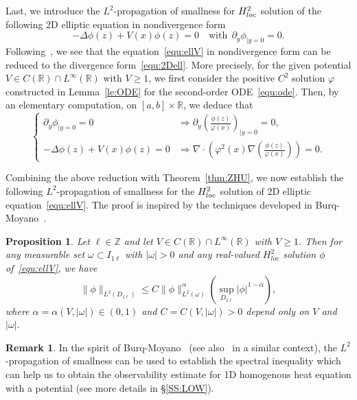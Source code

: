 \documentclass[a4paper,reqno]{amsart}
\newtheorem{proposition}[theorem]{Proposition}
\theoremstyle{definition}
\newtheorem{remark}[theorem]{Remark}
\numberwithin{equation}{section}
\newcommand{\R}{\mathbb{R}}
\def \R {{\mathbb{R} }}
\begin{document}
Last, we introduce the $L^{2}$-propagation of smallness for $H_{\emph{loc}}^{2}$ solution of the following 2D elliptic equation in nondivergence form
\begin{equation}\label{equ:ellV}
-\Delta \phi(z)+V(x)\phi (z)=0\quad \mbox{with}\ \ \partial_{y}\phi_{|y=0}=0.
\end{equation}
Following~\cite[Section 2]{LOGUNOV}, we see that the equation~\eqref{equ:ellV} in nondivergence form can be reduced to the divergence form~\eqref{equ:2Dell}. More precisely, for the given potential $V\in C(\R)\cap L^{\infty}(\R)$ with $V\ge 1$, we first consider the positive $C^{2}$ solution $\varphi$ constructed in Lemma~\ref{le:ODE} for the second-order ODE~\eqref{equ:ode}.
Then, by an elementary computation, on $[a,b]\times \R$, we deduce that 
\begin{equation}\label{equ:reduc}
\left\{\begin{aligned}
\partial_{y}\phi_{|y=0}=0
&\Longrightarrow \partial_{y}\left(\frac{\phi(z)}{\varphi(x)}\right)_{|y=0}=0,\\
-\Delta \phi(z)+V(x)\phi(z)=0&\Longrightarrow \nabla \cdot \left(\varphi^{2}(x)\nabla\left(\frac{\phi(z)}{\varphi(x)}\right) \right)=0.
\end{aligned}\right.
\end{equation}

Combining the above reduction with Theorem~\ref{thm:ZHU}, we now establish the following $L^{2}$-propagation of smallness for the $H_{\emph{loc}}^{2}$ solution of 2D elliptic equation~\eqref{equ:ellV}. The proof is inspired by the techniques developed in Burq-Moyano~\cite[Section 2]{BurqMoyano}.
\begin{proposition}\label{pro:L2}
Let $\ell\in \mathbb{Z}$ and let $V\in C(\R)\cap L^{\infty}(\R)$ with $V\ge 1$. Then for any measurable set $\omega\subset I_{1\ell}$ with $|\omega|>0$ and any real-valued $H_{loc}^{2}$ solution $\phi$ of~\eqref{equ:ellV}, we have 
\begin{equation*}
\|\phi\|_{L^{2}(D_{1\ell})}\le C\|\phi\|_{L^{2}(\omega)}^{\alpha}\left(\sup_{D_{2\ell}}|\phi|^{1-\alpha}\right),
\end{equation*}
where $\alpha=\alpha(V,|\omega|)\in (0,1)$ and $C=C(V,|\omega|)>0$ depend only on $V$ and $|\omega|$.
\end{proposition}

\begin{remark}
In the spirit of Burq-Moyano~\cite{BurqMoyano} (see also~\cite{BurqMoyanoJEMS} in a similar context), the $L^{2}$-propagation of smallness can be used to establish the spectral inequality which can help us to obtain the observability estimate for 1D homogenous heat equation with a potential (see more details in \S\ref{SS:LOW}).
\end{remark}
\end{document}
